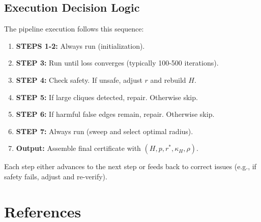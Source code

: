 \documentclass[11pt]{article}
\begin{document}
\subsection{Execution Decision Logic}

The pipeline execution follows this sequence:

\begin{enumerate}
  \item \textbf{STEPS 1-2:} Always run (initialization).
  \item \textbf{STEP 3:} Run until loss converges (typically 100-500 iterations).
  \item \textbf{STEP 4:} Check safety. If unsafe, adjust $r$ and rebuild $H$.
  \item \textbf{STEP 5:} If large cliques detected, repair. Otherwise skip.
  \item \textbf{STEP 6:} If harmful false edges remain, repair. Otherwise skip.
  \item \textbf{STEP 7:} Always run (sweep and select optimal radius).
  \item \textbf{Output:} Assemble final certificate with $(H, p, r^*, \kappa_H, \rho)$.
\end{enumerate}

Each step either advances to the next step or feeds back to correct issues
(e.g., if safety fails, adjust and re-verify).

\newpage



\newpage


\section*{References}
\end{document}
